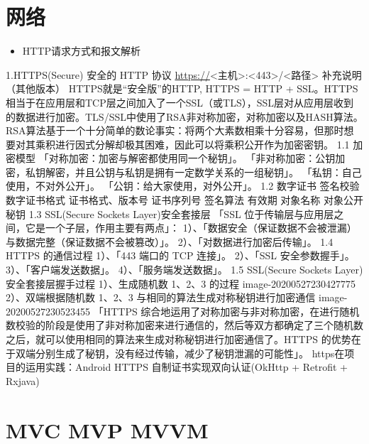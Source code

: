 \documentclass[9pt, b5paper]{article}
\begin{document}
\section{网络}
\label{sec-17}
\begin{itemize}
\item HTTP请求方式和报文解析
\end{itemize}
1.HTTPS(Secure) 安全的 HTTP 协议
\url{https://}<主机>:<443>/<路径>
补充说明（其他版本）
HTTPS就是“安全版”的HTTP, HTTPS = HTTP + SSL。HTTPS相当于在应用层和TCP层之间加入了一个SSL（或TLS），SSL层对从应用层收到的数据进行加密。TLS/SSL中使用了RSA非对称加密，对称加密以及HASH算法。
RSA算法基于一个十分简单的数论事实：将两个大素数相乘十分容易，但那时想要对其乘积进行因式分解却极其困难，因此可以将乘积公开作为加密密钥。
1.1 加密模型
「对称加密：加密与解密都使用同一个秘钥」。
「非对称加密：公钥加密，私钥解密，并且公钥与私钥是拥有一定数学关系的一组秘钥」。
「私钥：自己使用，不对外公开」。
「公钥：给大家使用，对外公开」。
1.2 数字证书 签名校验
数字证书格式
证书格式、版本号
证书序列号
签名算法
有效期
对象名称
对象公开秘钥
1.3 SSL(Secure Sockets Layer)安全套接层
「SSL 位于传输层与应用层之间，它是一个子层，作用主要有两点」：
1）、「数据安全（保证数据不会被泄漏）与数据完整（保证数据不会被篡改）」。
2）、「对数据进行加密后传输」。
1.4 HTTPS 的通信过程
1）、「443 端口的 TCP 连接」。
2）、「SSL 安全参数握手」。
3）、「客户端发送数据」。
4）、「服务端发送数据」。
1.5 SSL(Secure Sockets Layer) 安全套接层握手过程
1）、生成随机数 1、2、3 的过程
image-20200527230427775
2）、双端根据随机数 1、2、3 与相同的算法生成对称秘钥进行加密通信
image-20200527230523455
「HTTPS 综合地运用了对称加密与非对称加密，在进行随机数校验的阶段是使用了非对称加密来进行通信的，然后等双方都确定了三个随机数之后，就可以使用相同的算法来生成对称秘钥进行加密通信了。HTTPS 的优势在于双端分别生成了秘钥，没有经过传输，减少了秘钥泄漏的可能性」。
https在项目的运用实践：Android HTTPS 自制证书实现双向认证(OkHttp + Retrofit + Rxjava)

\section{MVC MVP MVVM}
\label{sec-18}
\end{document}
